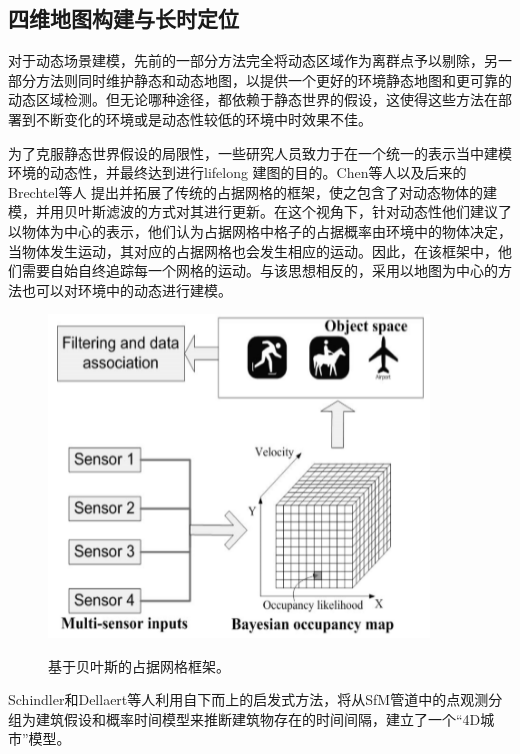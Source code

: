 \subsection{四维地图构建与长时定位}
\label{subsec:4Dmapping}
\newpage
对于动态场景建模，先前的一部分方法完全将动态区域作为离群点予以剔除，另一部分方法则同时维护静态和动态地图，以提供一个更好的环境静态地图和更可靠的动态区域检测。但无论哪种途径，都依赖于静态世界的假设，这使得这些方法在部署到不断变化的环境或是动态性较低的环境中时效果不佳。

为了克服静态世界假设的局限性，一些研究人员致力于在一个统一的表示当中建模环境的动态性，并最终达到进行lifelong 建图的目的。Chen等人\cite{Chen2006Dynamic}以及后来的Brechtel等人\cite{Brechtel2010Recursive} 提出并拓展了传统的占据网格的框架，使之包含了对动态物体的建模，并用贝叶斯滤波的方式对其进行更新。在这个视角下，针对动态性他们建议了以物体为中心的表示，他们认为占据网格中格子的占据概率由环境中的物体决定，当物体发生运动，其对应的占据网格也会发生相应的运动。因此，在该框架中，他们需要自始自终追踪每一个网格的运动。与该思想相反的，采用以地图为中心的方法也可以对环境中的动态进行建模。

\begin{figure}[htbp]
	\centering
	\includegraphics[width=0.9\textwidth]{figs/2-3/bayesian.png}
	\label{fig: object tracking system}
	\caption{基于贝叶斯的占据网格框架。}
\end{figure}

Schindler和Dellaert等人\cite{Schindler2010Probabilistic}利用自下而上的启发式方法，将从SfM管道中的点观测分组为建筑假设和概率时间模型来推断建筑物存在的时间间隔，建立了一个“4D城市”模型。

